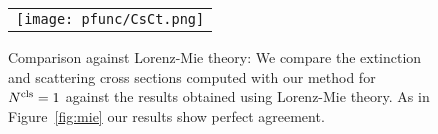 \begin{figure}
    \centering
    \setlength{\resLen}{3.5in}
    \addtolength{\tabcolsep}{-3pt}
    \begin{tabular}{c}
        \texttt{[image: pfunc/CsCt.png]} 
    \end{tabular}
    \caption{
        Comparison against Lorenz-Mie theory: We compare the extinction and scattering cross sections computed with our method for ${N^\text{cls}}=1$ against the results obtained using Lorenz-Mie theory. As in Figure~\ref{fig:mie} our results show perfect agreement. 
    \label{fig:mie2}
}
\end{figure}
